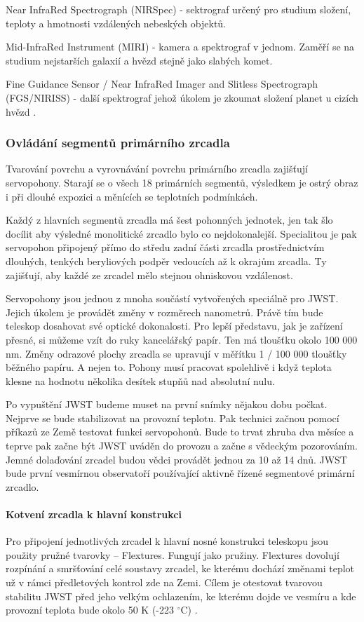 \documentclass[a4paper,11pt]{article}
\begin{document}
Near InfraRed Spectrograph (NIRSpec) - sektrograf určený pro studium složení, teploty a hmotnosti vzdálených nebeských objektů.

Mid-InfraRed Instrument (MIRI) - kamera a spektrograf v jednom. Zaměří se na studium nejstarších galaxií a hvězd stejně jako slabých komet.

Fine Guidance Sensor / Near InfraRed Imager and Slitless Spectrograph (FGS/NIRISS) - další spektrograf jehož úkolem je zkoumat složení planet u cizích hvězd \cite{abcko}.

\subsubsection{Ovládání segmentů primárního zrcadla}
Tvarování povrchu a vyrovnávání povrchu primárního zrcadla zajišťují servopohony. Starají se o všech 18 primárních segmentů, výsledkem je ostrý obraz i při dlouhé expozici a měnících se teplotních podmínkách.


Každý z hlavních segmentů zrcadla má šest pohonných jednotek, jen tak šlo docílit aby výsledné monolitické zrcadlo bylo co nejdokonalejší. Specialitou je pak servopohon připojený přímo do středu zadní části zrcadla prostřednictvím dlouhých, tenkých beryliových podpěr vedoucích až k okrajům zrcadla. Ty zajišťují, aby každé ze zrcadel mělo stejnou ohniskovou vzdálenost.


Servopohony jsou jednou z mnoha součástí vytvořených speciálně pro JWST. Jejich úkolem je provádět změny v rozměrech nanometrů. Právě tím bude teleskop dosahovat své optické dokonalosti. Pro lepší představu, jak je zařízení přesné, si můžeme vzít do ruky kancelářský papír. Ten má  tloušťku okolo  100 000 nm. Změny odrazové plochy zrcadla se upravují v měřítku  1 / 100 000 tloušťky běžného papíru. A nejen to. Pohony musí pracovat spolehlivě i když teplota klesne na hodnotu několika desítek stupňů nad absolutní nulu.

Po vypuštění JWST budeme muset na první snímky nějakou dobu počkat. Nejprve se bude  stabilizovat na provozní teplotu. Pak technici začnou pomocí příkazů ze Země testovat funkci servopohonů. Bude to trvat zhruba dva měsíce a teprve pak začne být JWST uváděn do provozu a začne s vědeckým pozorováním. Jemné dolaďování zrcadel budou vědci provádět jednou za 10 až 14 dnů. JWST bude první vesmírnou observatoří používající aktivně řízené segmentové primární zrcadlo.

\paragraph{Kotvení zrcadla k hlavní konstrukci}
Pro připojení jednotlivých zrcadel k hlavní nosné konstrukci teleskopu jsou použity pružné tvarovky – Flextures. Fungují jako pružiny. Flextures dovolují rozpínání a smršťování celé soustavy zrcadel, ke kterému dochází změnami teplot  už v rámci předletových kontrol zde na Zemi. Cílem je otestovat tvarovou stabilitu JWST před jeho velkým ochlazením, ke kterému dojde ve vesmíru a kde provozní teplota bude okolo 50 K (-223 $^\circ$C) \cite{osel}.
\end{document}
